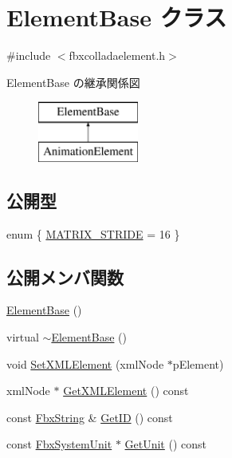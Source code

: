 \hypertarget{class_element_base}{}\section{Element\+Base クラス}
\label{class_element_base}


{\ttfamily \#include $<$fbxcolladaelement.\+h$>$}

Element\+Base の継承関係図\begin{figure}[H]
\begin{center}
\leavevmode
\includegraphics[height=2.000000cm]{class_element_base}
\end{center}
\end{figure}
\subsection*{公開型}
\begin{DoxyCompactItemize}
\item 
enum \{ \hyperlink{class_element_base_a67c3058543230affdf2d6ebb71a2acc5a858ba1419e1ab2616ccb5fbd91557074}{M\+A\+T\+R\+I\+X\+\_\+\+S\+T\+R\+I\+DE} = 16
 \}
\end{DoxyCompactItemize}
\subsection*{公開メンバ関数}
\begin{DoxyCompactItemize}
\item 
\hyperlink{class_element_base_a4c7415e032db4a4d1890edd5fed2eb01}{Element\+Base} ()
\item 
virtual \hyperlink{class_element_base_a564b84810083ca6558d00c331bd9eccd}{$\sim$\+Element\+Base} ()
\item 
void \hyperlink{class_element_base_a7d2be8b683fab79fab4c45aaf484f18c}{Set\+X\+M\+L\+Element} (xml\+Node $\ast$p\+Element)
\item 
xml\+Node $\ast$ \hyperlink{class_element_base_adb072862588f793bb86e70f43df92b27}{Get\+X\+M\+L\+Element} () const
\item 
const \hyperlink{class_fbx_string}{Fbx\+String} \& \hyperlink{class_element_base_a9a8bf10158b3028d050f17d357be5ebb}{Get\+ID} () const
\item 
const \hyperlink{class_fbx_system_unit}{Fbx\+System\+Unit} $\ast$ \hyperlink{class_element_base_a1449309f004525a5c009d1fb7d3cb60c}{Get\+Unit} () const
\end{DoxyCompactItemize}
